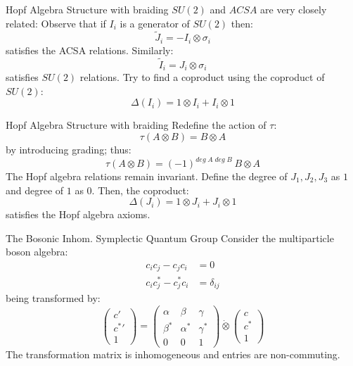 \documentclass[pdf,colorBG,slideColor,fyma]{prosper}
\newcommand{\beq}{\[}
\newcommand{\eeq}{\]}
\begin{document}
\begin{slide}{Hopf Algebra Structure with braiding}
$SU(2)$ and $ACSA$ are very closely related:
\break
\break
Observe that if $I_i$ is a generator of $SU(2)$ then:
\[
\tilde{J}_i = - I_i \otimes \sigma_i
\]
satisfies the ACSA relations. Similarly:
\[
\tilde{I}_i = J_i \otimes \sigma_i
\]
satisfies $SU(2)$ relations.
\break
\break
Try to find a coproduct using the coproduct of $SU(2)$:
\[
\Delta(I_i) = 1 \otimes I_i + I_i \otimes 1
\]

\end{slide}


\begin{slide}{Hopf Algebra Structure with braiding}
Redefine the action of $\tau$:
\beq
\tau(A \otimes B) = B \otimes A
\eeq
by introducing grading; thus:
\beq
\tau(A \otimes B) = (-1)^{deg\;A\; deg\;B\;} B \otimes A
\eeq
The Hopf algebra relations remain invariant.
\break
\break
Define the degree of $J_1, J_2, J_3$ as $1$ and degree of $1$ as $0$. Then, the coproduct:
\beq
\Delta(J_i) = 1 \otimes J_i + J_i \otimes 1
\eeq
satisfies the Hopf algebra axioms.
\end{slide}


\begin{slide}{The Bosonic Inhom. Symplectic Quantum Group}
Consider the multiparticle boson algebra:
\begin{align*}
c_i c_j - c_j c_i & = 0 \\
c_i c^*_j - c^*_j c_i & = \delta_{ij}
\end{align*}
being transformed by:
\beq
\left(
\begin{array}{c}
c' \\
{c^{*}}' \\
1
\end{array}
\right) = \left(
\begin{array}{ccc}
\alpha & \beta & \gamma \\
\beta^* & \alpha^* & \gamma^* \\
0 & 0 & 1
\end{array}
\right) \dot{\otimes} \left(
\begin{array}{c}
c \\
c^* \\
1
\end{array}
\right)
\eeq
\break
\break
The transformation matrix is inhomogeneous and entries are non-commuting.
\end{slide}
\end{document}
